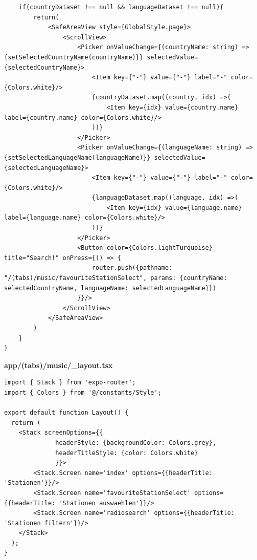 \documentclass[11pt, twoside]{article}
\begin{document}
\begin{lstlisting}
    if(countryDataset !== null && languageDataset !== null){
        return(
            <SafeAreaView style={GlobalStyle.page}>
                <ScrollView>
                    <Picker onValueChange={(countryName: string) => {setSelectedCountryName(countryName)}} selectedValue={selectedCountryName}>
                        <Item key={"-"} value={"-"} label="-" color={Colors.white}/>
                        {countryDataset.map((country, idx) =>(
                            <Item key={idx} value={country.name} label={country.name} color={Colors.white}/>
                        ))}
                    </Picker>
                    <Picker onValueChange={(languageName: string) => {setSelectedLanguageName(languageName)}} selectedValue={selectedLanguageName}>
                        <Item key={"-"} value={"-"} label="-" color={Colors.white}/>
                        {languageDataset.map((language, idx) =>(
                            <Item key={idx} value={language.name} label={language.name} color={Colors.white}/>
                        ))}
                    </Picker>
                    <Button color={Colors.lightTurquoise} title="Search!" onPress={() => {
                        router.push({pathname: "/(tabs)/music/favouriteStationSelect", params: {countryName: selectedCountryName, languageName: selectedLanguageName}})
                    }}/>
                </ScrollView>
            </SafeAreaView>
        )
    }
}
\end{lstlisting}

\textbf{app/(tabs)/music/\_layout.tsx}
\begin{lstlisting}
import { Stack } from 'expo-router';
import { Colors } from '@/constants/Style';

export default function Layout() {
  return (
    <Stack screenOptions={{
              headerStyle: {backgroundColor: Colors.grey},
              headerTitleStyle: {color: Colors.white}
              }}>
        <Stack.Screen name='index' options={{headerTitle: 'Stationen'}}/>
        <Stack.Screen name='favouriteStationSelect' options={{headerTitle: 'Stationen auswaehlen'}}/>
        <Stack.Screen name='radiosearch' options={{headerTitle: 'Stationen filtern'}}/>
    </Stack>
  );
}
\end{lstlisting}
\end{document}
